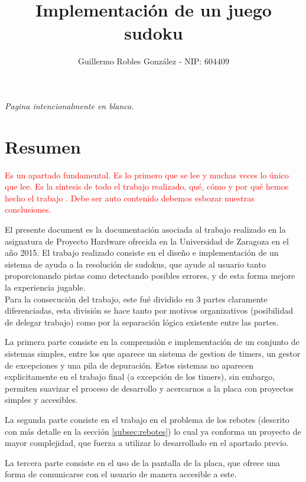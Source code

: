 \documentclass[12pt,letterpaper]{article}
\title{Implementación de un juego sudoku} %
\author{Guillermo Robles González - NIP: 604409}
\newcommand*{\blankpage}[1]{%
  \vspace*{\fill}
  \begin{center} \textit{#1} \end{center}
  \vspace{\fill}
  \clearpage}
\begin{document}
\shorthandoff{>}
\shorthandoff{<}
\maketitle
\blankpage{Pagina intencionalmente en blanco.}
\tableofcontents
\clearpage

\section{Resumen}
\label{sec:resumen}
\textcolor{red}{
  Es un apartado fundamental. Es lo primero que se lee y muchas veces lo
  único que lee. Es la síntesis de todo el trabajo realizado, qué, cómo
  y por qué hemos hecho el trabajo . Debe ser auto contenido debemos
  esbozar nuestras conclusiones.\\
}

El presente document es la documentación asociada al trabajo realizado
en la asignatura de Proyecto Hardware ofrecida en la Universidad de
Zaragoza en el año 2015. El trabajo realizado consiste en el diseño e
implementación de un sistema de ayuda a la resolución de sudokus, que
ayude al usuario tanto proporcionando pistas como detectando posibles
errores, y de esta forma mejore la experiencia jugable.\\

Para la consecución del trabajo, este fué dividido en 3 partes
claramente diferenciadas, esta división se hace tanto por motivos
organizativos (posibilidad de delegar trabajo) como por la separación
lógica existente entre las partes.

La primera parte consiste en la comprensión e implementación de un
conjunto de sistemas simples, entre los que aparece un sistema de
gestion de timers, un gestor de excepciones y una pila de
depuración. Estos sistemas no aparecen explicitamente en el trabajo
final (a excepción de los timers), sin embargo, permiten suavizar el
proceso de desarrollo y acercarnos a la placa con proyectos simples y
accesibles.

La segunda parte consiste en el trabajo en el problema de los rebotes
(descrito con más detalle en la sección \ref{subsec:rebotes}) lo
cual ya conforma un proyecto de mayor complejidad, que fuerza a
utilizar lo desarrollado en el apartado previo.

La tercera parte consiste en el uso de la pantalla de la placa, que
ofrece una forma de comunicarse con el usuario de manera accesible a
este.
\end{document}
